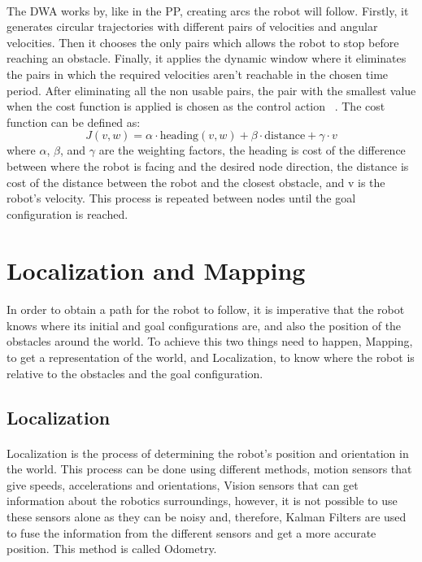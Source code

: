 \paragraph{}The \gls{DWA} works by, like in the \gls{PP}, creating arcs the robot will follow. Firstly, it generates 
circular trajectories with different pairs of velocities and angular velocities. Then it chooses 
the only pairs which allows the robot to stop before reaching an obstacle. Finally, it applies the 
dynamic window where it eliminates the pairs in which the required velocities aren't reachable in the 
chosen time period. After eliminating all the non usable pairs, the pair with the smallest value 
when the cost function is applied is chosen as the control action ~\cite{DWAT}. The cost function can be defined as:
\begin{equation}
    J(v, w) = \alpha \cdot \text{heading}(v, w) + \beta \cdot \text{distance} + \gamma \cdot v
\end{equation}
where $\alpha$, $\beta$, and $\gamma$ are the weighting factors, the heading is cost of the difference between where the robot 
is facing and the desired node direction, the distance is cost of the distance between the robot and the closest obstacle, and v is the
 robot's velocity. This process is repeated between nodes until the goal configuration is reached.


\section{Localization and Mapping}
\label{sec:LM}
\paragraph{}In order to obtain a path for the robot to follow, it is imperative that the robot knows 
where its initial and goal configurations are, and also the position of the obstacles around the world. 
To achieve this two things need to happen, Mapping, to get a representation of the world, and 
Localization, to know where the robot is relative to the obstacles and the goal configuration. 
\subsection{Localization}
\label{subsec:Localization}
\paragraph{}Localization is the process of determining the robot's position and orientation in the world. 
This process can be done using different methods, motion sensors that give speeds, accelerations and orientations, Vision sensors that can 
get information about the robotics surroundings, however, it is not possible to use these sensors alone as 
they can be noisy \cite{loc1} and, therefore, Kalman Filters are used to fuse the information from the 
different sensors and get a more accurate position. This method is called Odometry.
